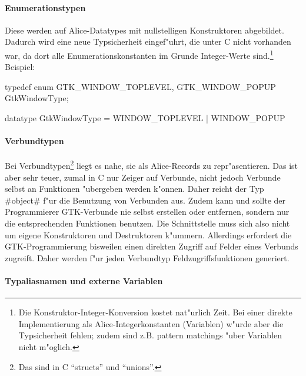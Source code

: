 \documentclass[a4paper,titlepage]{article}
\newenvironment{code}{\verbatim}{\endverbatim}
\begin{document}
\paragraph{Enumerationstypen}

Diese werden auf Alice-Datatypes mit nullstelligen
Konstruktoren abgebildet. Dadurch wird eine neue Typsicherheit eingef"uhrt,
die unter C nicht vorhanden war, da dort alle Enumerationskonstanten im Grunde
Integer-Werte sind.\footnote{Die Konstruktor-Integer-Konversion kostet
nat"urlich Zeit. Bei einer direkte Implementierung als Alice-Integerkonstanten
(Variablen) w"urde aber die Typsicherheit fehlen; zudem sind z.B.
pattern matchings "uber Variablen nicht m"oglich.} Beispiel:\\[\parskip]

\begin{minipage}[t]{5cm}
\begin{code}
typedef enum {
  GTK_WINDOW_TOPLEVEL,
  GTK_WINDOW_POPUP
} GtkWindowType;
\end{code}
\end{minipage}
\begin{minipage}[t]{5cm}
\begin{code}
datatype GtkWindowType =
  WINDOW_TOPLEVEL
| WINDOW_POPUP
\end{code}
\end{minipage}

\paragraph{Verbundtypen}

Bei Verbundtypen\footnote{Das sind in C ``structs'' und ``unions''.} 
liegt es nahe,
sie als Alice-Records zu repr"asentieren. Das ist aber sehr teuer, zumal in C
nur Zeiger auf Verbunde, nicht jedoch Verbunde selbst
an Funktionen "ubergeben werden k"onnen.
Daher reicht der Typ #object# f"ur die Benutzung von Verbunden aus.
Zudem kann und sollte der Programmierer GTK-Verbunde nie selbst
erstellen oder entfernen, sondern nur die entsprechenden Funktionen benutzen.
Die Schnittstelle muss sich also nicht um eigene Konstruktoren und Destruktoren
k"ummern. Allerdings erfordert die GTK-Programmierung bisweilen einen direkten
Zugriff auf Felder eines Verbunds zugreift. Daher werden f"ur jeden
Verbundtyp Feldzugriffsfunktionen generiert.

\paragraph{Typaliasnamen und externe Variablen}
\end{document}
